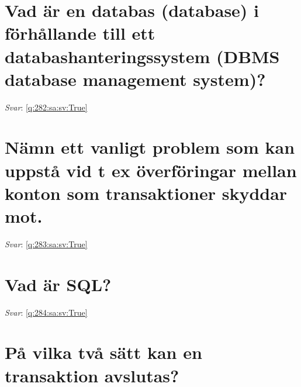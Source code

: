\documentclass[a4paper,11pt,oneside]{book}
\begin{document}
\begin{sloppypar}
\section{Vad \"ar en databas (database) i f\"orh\r{a}llande till ett databashanteringssystem (DBMS {\textendash} database management system)?}

\label{q:282:sa:sv:False}

\vspace{2cm}

\noindent\makebox[\textwidth]{\hrulefill}

\vspace{1cm}

\textit{Svar}: \autoref{q:282:sa:sv:True}



\section{N\"amn ett vanligt problem som kan uppst\r{a} vid t ex \"overf\"oringar mellan konton som transaktioner skyddar mot.}

\label{q:283:sa:sv:False}

\vspace{2cm}

\noindent\makebox[\textwidth]{\hrulefill}

\vspace{1cm}

\textit{Svar}: \autoref{q:283:sa:sv:True}



\section{Vad \"ar SQL?}

\label{q:284:sa:sv:False}

\vspace{2cm}

\noindent\makebox[\textwidth]{\hrulefill}

\vspace{1cm}

\textit{Svar}: \autoref{q:284:sa:sv:True}



\section{P\r{a} vilka tv\r{a} s\"att kan en transaktion avslutas?}

\label{q:285:sa:sv:False}


\end{sloppypar}
\end{document}
